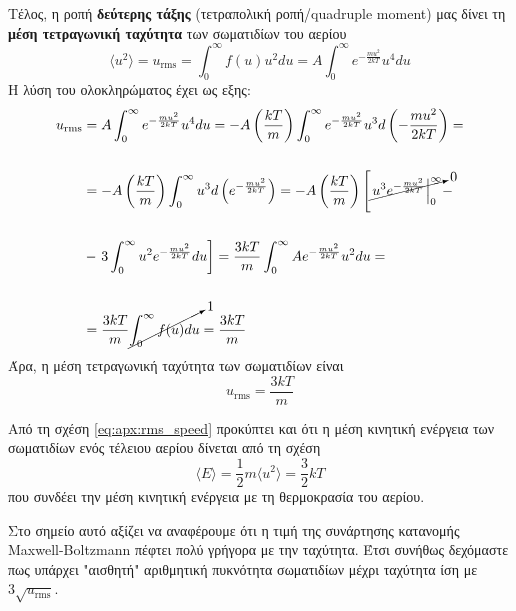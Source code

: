 Τέλος, η ροπή \textbf{δεύτερης τάξης} (τετραπολική ροπή/quadruple moment) μας δίνει τη \textbf{μέση τετραγωνική ταχύτητα} των σωματιδίων του αερίου
\begin{equation}
    \label{eq:apx:quadruple_moment}
    \langle u^2 \rangle = u_{\text{rms}} = \int_{0}^{\infty} f(u) u^2 du = A \int_{0}^{\infty} e^{-\frac{mu^2}{2kT}} u^4 du
\end{equation}
Η λύση του ολοκληρώματος έχει ως εξης:
\begin{align*}
    u_{\text{rms}} & = A \int_{0}^{\infty} e^{-\frac{mu^2}{2kT}} u^4 du = -A \left( \frac{kT}{m} \right) \int_{0}^{\infty} e^{-\frac{mu^2}{2kT}} u^3 d \left( - \frac{mu^2}{2kT} \right) = \\\\
    &= -A \left( \frac{kT}{m} \right) \int_{0}^{\infty} u^3 d \left( e^{- \frac{mu^2}{2kT}} \right) = -A \left( \frac{kT}{m} \right) \left [ \cancelto{0}{\left. u^3 e^{- \frac{mu^2}{2kT}} \right|_{0}^{\infty}} - \right. \\\\
    &- \left. 3 \int_{0}^{\infty} u^2 e^{-\frac{mu^2}{2kT}} du \right] = \frac{3kT}{m} \int_{0}^{\infty} A e^{-\frac{mu^2}{2kT}} u^2 du = \\\\
    &= \frac{3kT}{m} \cancelto{1}{\int_{0}^{\infty} f(u) du} = \frac{3kT}{m}
\end{align*}
Άρα, η μέση τετραγωνική ταχύτητα των σωματιδίων είναι
\begin{equation}
    \label{eq:apx:rms_speed}
    \boxed{u_{\text{rms}} = \frac{3kT}{m}}
\end{equation}

Από τη σχέση \eqref{eq:apx:rms_speed} προκύπτει και ότι η μέση κινητική ενέργεια των σωματιδίων ενός τέλειου αερίου δίνεται από τη σχέση
\begin{equation}
    \label{eq:apx:mean_kinetic_energy}
    \langle E \rangle = \frac{1}{2} m \langle u^2 \rangle = \frac{3}{2} kT
\end{equation}
που συνδέει την μέση κινητική ενέργεια με τη θερμοκρασία του αερίου.

Στο σημείο αυτό αξίζει να αναφέρουμε ότι η τιμή της συνάρτησης κατανομής Maxwell-Boltzmann πέφτει πολύ γρήγορα με την ταχύτητα. Έτσι συνήθως δεχόμαστε πως υπάρχει "αισθητή" αριθμητική πυκνότητα σωματιδίων μέχρι ταχύτητα ίση με $3 \sqrt{u_{\text{rms}}}$.
